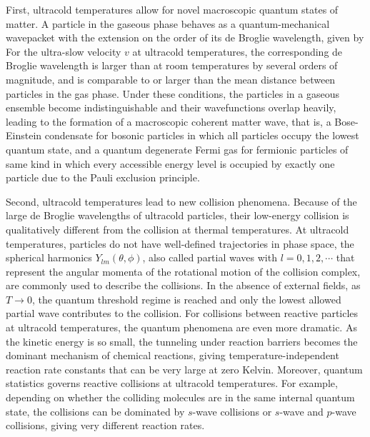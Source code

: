 First, ultracold temperatures allow for novel macroscopic quantum states of matter. A particle in the gaseous phase behaves as a quantum-mechanical 
wavepacket with the extension on the order of its de Broglie wavelength, given by
For the ultra-slow velocity $v$ at ultracold temperatures, the corresponding de Broglie wavelength is larger than at room temperatures by several orders of magnitude, 
and is comparable to or larger than the mean distance between particles in the gas phase. Under these conditions,
the particles in a gaseous ensemble become indistinguishable and their wavefunctions overlap heavily, leading to the formation of
a macroscopic coherent matter wave, that is, a Bose-Einstein condensate\cite{ketterle2002, anglin2002} for bosonic 
particles in which all particles occupy the lowest quantum state, and a quantum degenerate Fermi gas\cite{lev2002, stefano2008} for fermionic 
particles of same kind in which every accessible energy level is occupied by exactly one particle due to the Pauli exclusion principle. 

Second, ultracold temperatures lead to new collision phenomena.
Because of the large de Broglie wavelengths of ultracold particles, their low-energy collision is 
qualitatively different from the collision at thermal temperatures. At ultracold temperatures, particles
do not have well-defined trajectories in phase space, the spherical harmonics $Y_{lm}(\theta, \phi)$, also called 
partial waves with $l = 0, 1, 2, \cdots$ that represent the angular momenta of the rotational motion of the collision complex,  are commonly used to describe the collisions. In the absence of external fields, as $T 
\rightarrow 0$, the quantum threshold regime is reached and only the lowest allowed partial wave contributes to the 
collision\cite{wigner1948, krems2005}. For collisions between reactive particles at ultracold temperatures, the quantum phenomena are
even more dramatic. As the kinetic energy is so small, the tunneling under reaction barriers becomes the 
dominant mechanism of chemical reactions, giving temperature-independent reaction rate constants that 
can be very large at zero Kelvin\cite{balakrishnan2001, bodo2002, bodo2004, weck2004}. Moreover, quantum statistics 
governs reactive collisions at ultracold temperatures. For example, depending on 
whether the colliding molecules are in the same internal quantum state, the collisions can be dominated by 
$s$-wave collisions or $s$-wave and $p$-wave collisions, giving very different reaction rates\cite{ospelkaus2010}. 

